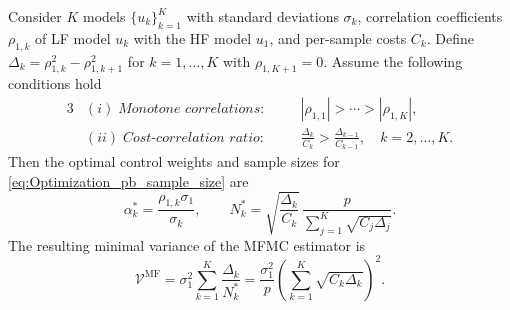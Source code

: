 %
\begin{theorem}\label{thm:Sample_size_est}
Consider $K$ models $\{u_{k}\}_{k=1}^K$ with standard deviations $\sigma_k$, correlation coefficients $\rho_{1,k}$ of LF model $u_k$ with the HF model $u_1$, and per-sample costs $C_k$. Define $\Delta_k = \rho_{1,k}^2 - \rho_{1,k+1}^2$ for $k = 1, \dots, K$ with $\rho_{1,K+1}=0$. Assume the following conditions hold
%
\begin{alignat*}{3}
&(i)\;\textit{Monotone correlations:} &\quad& |\rho_{1,1}| > \cdots > |\rho_{1,K}|,\\
&(ii)\;\textit{Cost-correlation ratio:} &\quad& \frac{\Delta_{k}}{C_k} > \frac{\Delta_{k-1}}{C_{k-1}}, \quad k=2,\ldots,K.
\end{alignat*}
%
Then the optimal control weights and sample sizes for \eqref{eq:Optimization_pb_sample_size} are
%
\begin{equation}\label{eq:MFMC_RealValued_Sample_Size}
    \alpha_k^* = \frac{\rho_{1,k}\sigma_1}{\sigma_k}, \qquad
    N_k^* = \sqrt{\frac{\Delta_k}{C_k}}\,
    \frac{p}{\sum_{j=1}^K \sqrt{C_j \Delta_j}}.
\end{equation}
%
%
The resulting minimal variance of the MFMC estimator is
\begin{equation}\label{eq:MFMC_variance_optimal}
\mathcal{V}^{\text{MF}}
= \sigma_1^2\sum_{k=1}^K \frac{\Delta_k}{N_k^*}=\frac{\sigma_1^2}{p}\!\left(\sum_{k=1}^K \sqrt{C_k \Delta_k}\right)^{\!2}.
\end{equation}
\end{theorem}
%

